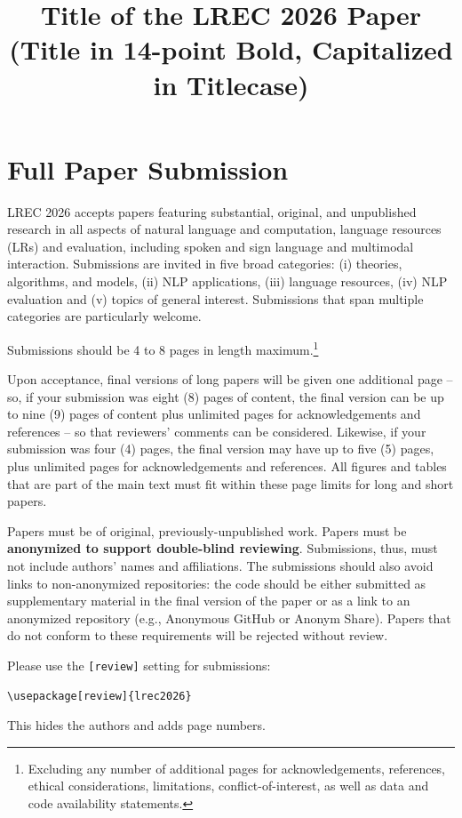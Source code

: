 \documentclass[10pt, a4paper]{article}
\title{Title of the LREC 2026 Paper (Title in 14-point Bold, Capitalized in Titlecase)}
\begin{document}
\maketitleabstract

\section{Full Paper Submission}

LREC 2026 accepts papers featuring substantial, original, and unpublished research in all aspects of natural language and computation, language resources (LRs) and evaluation, including spoken and sign language and multimodal interaction. Submissions are invited in five broad categories: (i) theories, algorithms, and models, (ii) NLP applications, (iii) language resources, (iv) NLP evaluation and (v) topics of general interest. Submissions that span multiple categories are particularly welcome.   

Submissions should be 4 to 8 pages in length maximum.\footnote{Excluding any number of additional pages for acknowledgements, references, ethical considerations, limitations, conflict-of-interest, as well as data and code availability statements.}

Upon acceptance, final versions of long papers will be given one
additional page – so, if your submission was eight (8) pages of content, the final version can be up to nine (9) pages of content plus unlimited pages for acknowledgements and references – so that reviewers’ comments can be considered. Likewise, if your submission was four (4) pages, the final version may have up to five (5) pages, plus unlimited pages for acknowledgements and references. All figures and tables that are part of the main text must fit within these page limits for long and short papers.

Papers must be of original, previously-unpublished work. Papers must be \textbf{anonymized to support double-blind reviewing}. Submissions, thus, must not include authors’ names and affiliations. The submissions should also avoid links to non-anonymized repositories: the code should be either submitted as supplementary material in the final version of the paper or as a link to an anonymized repository (e.g., Anonymous GitHub or Anonym Share). Papers that do not conform to these requirements will be rejected without review.

Please use the \texttt{[review]} setting for submissions:

\begin{verbatim}
\usepackage[review]{lrec2026}
\end{verbatim}

This hides the authors and adds page numbers.
\end{document}
